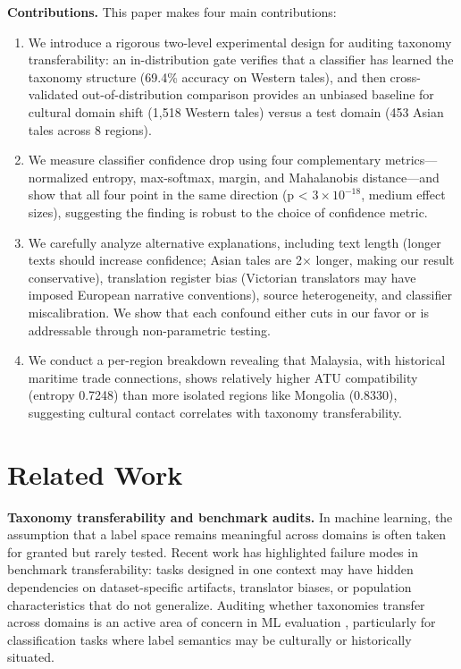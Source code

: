 \documentclass{article}
\begin{document}
\textbf{Contributions.} This paper makes four main contributions:
\begin{enumerate}
\item We introduce a rigorous two-level experimental design for auditing taxonomy transferability: an in-distribution gate verifies that a classifier has learned the taxonomy structure (69.4\% accuracy on Western tales), and then cross-validated out-of-distribution comparison provides an unbiased baseline for cultural domain shift (1,518 Western tales) versus a test domain (453 Asian tales across 8 regions).
\item We measure classifier confidence drop using four complementary metrics---normalized entropy, max-softmax, margin, and Mahalanobis distance---and show that all four point in the same direction (p < $3 \times 10^{-18}$, medium effect sizes), suggesting the finding is robust to the choice of confidence metric.
\item We carefully analyze alternative explanations, including text length (longer texts should increase confidence; Asian tales are 2$\times$ longer, making our result conservative), translation register bias (Victorian translators may have imposed European narrative conventions), source heterogeneity, and classifier miscalibration. We show that each confound either cuts in our favor or is addressable through non-parametric testing.
\item We conduct a per-region breakdown revealing that Malaysia, with historical maritime trade connections, shows relatively higher ATU compatibility (entropy 0.7248) than more isolated regions like Mongolia (0.8330), suggesting cultural contact correlates with taxonomy transferability.
\end{enumerate}

\section{Related Work}

\textbf{Taxonomy transferability and benchmark audits.} In machine learning, the assumption that a label space remains meaningful across domains is often taken for granted but rarely tested. Recent work has highlighted failure modes in benchmark transferability: tasks designed in one context may have hidden dependencies on dataset-specific artifacts, translator biases, or population characteristics that do not generalize. Auditing whether taxonomies transfer across domains is an active area of concern in ML evaluation \citep{guo2017}, particularly for classification tasks where label semantics may be culturally or historically situated.
\end{document}
